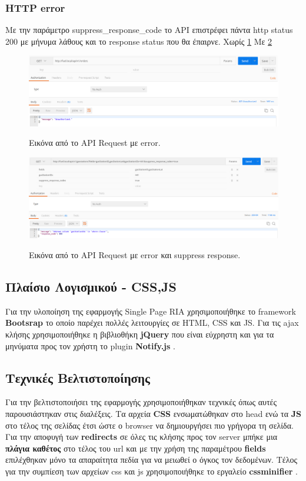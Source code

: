 \subsubsection{HTTP error}
Με την παράμετρο suppress\_response\_code το API επιστρέφει πάντα http status 200 με μήνυμα λάθους και το response status που θα έπαιρνε. Χωρίς \ref{fig:error} Με \ref{fig:suppress}

\begin{figure}[H]
  \caption{Εικόνα από το API Request με error.}
  \centering
    \includegraphics[width=1\textwidth]{img/error.png}
    \label{fig:error}
\end{figure}

\begin{figure}[H]
  \caption{Εικόνα από το API Request με error και suppress response.}
  \centering
    \includegraphics[width=1\textwidth]{img/suppress.png}
    \label{fig:suppress}
\end{figure}

\subsection{Πλαίσιο Λογισμικού - CSS,JS}
Για την υλοποίηση της εφαρμογής Single Page RIA χρησιμοποιήθηκε το framework \textbf{Βootsrap} \cite{bootstrap}
το οποίο παρέχει πολλές λειτουργίες σε HTML, CSS και JS. Για τις ajax κλήσης χρησιμοποιήθηκε η βιβλιοθήκη \textbf{jQuery} \cite{jquery} που είναι εύχρηστη και για τα μηνύματα προς τον χρήστη το plugin \textbf{Notify.js} \cite{notify}.

\subsection{Τεχνικές Βελτιστοποίησης}
Για την βελτιστοποιήσει της εφαρμογής χρησιμοποιήθηκαν τεχνικές όπως αυτές παρουσιάστηκαν στις διαλέξεις. Τα αρχεία \textbf{CSS} ενσωματώθηκαν στο head ενώ τα \textbf{JS} στο τέλος της σελίδας έτσι ώστε ο browser να δημιουργήσει πιο γρήγορα τη σελίδα. Για την αποφυγή των \textbf{redirects} σε όλες τις κλήσης προς τον server μπήκε μια \textbf{πλάγια καθέτος} στο τέλος του url και με την χρήση της παραμέτρου \textbf{fields} επιλέχθηκαν μόνο τα απαραίτητα πεδία για να μειωθεί ο όγκος τον δεδομένων. Τέλος για την συμπίεση των αρχείων css και js χρησιμοποιήθηκε το εργαλείο \textbf{cssminifier} \cite{cssminifier}.

